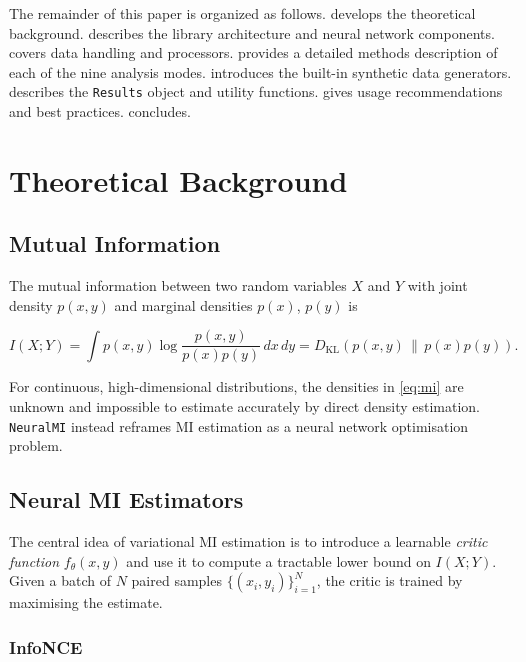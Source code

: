 \documentclass[12pt]{article}
\newcommand{\nmi}{\texttt{NeuralMI}}
\newcommand{\api}[1]{\texttt{#1}}
\newcommand{\MI}[1]{I(#1)}
\newcommand{\KL}[2]{D_{\mathrm{KL}}\!\left(#1\,\|\,#2\right)}
\begin{document}
The remainder of this paper is organized as follows.
 develops the theoretical background.
 describes the library architecture and neural
network components.
 covers data handling and processors.
 provides a detailed methods description of each of the
nine analysis modes.
 introduces the built-in synthetic data generators.
 describes the \api{Results} object and utility functions.
 gives usage recommendations and best practices.
 concludes.

\section{Theoretical Background}
\label{sec:theory}

\subsection{Mutual Information}
\label{sec:theory:mi}

The mutual information between two random variables $X$ and $Y$ with joint
density $p(x,y)$ and marginal densities $p(x)$, $p(y)$ is

\begin{equation}
  \MI{X;Y}
  = \int p(x,y)\log\frac{p(x,y)}{p(x)p(y)}\,dx\,dy
  = \KL{p(x,y)}{p(x)p(y)}.
  \label{eq:mi}
\end{equation}

For continuous, high-dimensional distributions, the densities in
\cref{eq:mi} are unknown and impossible to estimate accurately by
direct density estimation.  \nmi{} instead reframes MI estimation as a
neural network optimisation problem.

\subsection{Neural MI Estimators}
\label{sec:theory:estimators}

The central idea of variational MI estimation is to introduce a learnable
\emph{critic function} $f_\theta(x,y)$ and use it to compute a tractable
lower bound on $\MI{X;Y}$.  Given a batch of $N$ paired samples
$\{(x_i, y_i)\}_{i=1}^N$, the critic is trained by maximising the
estimate.

\subsubsection{InfoNCE}
\label{sec:theory:infonce}
\end{document}
